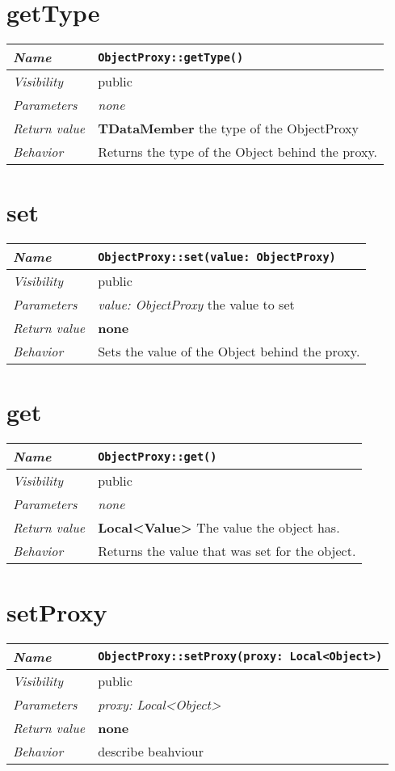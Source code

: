  \section{getType}
\begin{longtable}{p{3cm} @{\hskip 1cm} p{12cm}}
 \hline
\textit{Name} & \texttt{ObjectProxy::getType()}\\
\hline
 \textit{Visibility} & public\\
\hline
\textit{Parameters} & \textit{none}\\
\hline
\textit{Return value} & \textbf{TDataMember} the type of the ObjectProxy\\
  \hline
 \textit{Behavior} & Returns the type of the Object behind the proxy.\\
\hline
\end{longtable} \pagebreak
 \section{set}
\begin{longtable}{p{3cm} @{\hskip 1cm} p{12cm}}
 \hline
\textit{Name} & \texttt{ObjectProxy::set(value: ObjectProxy)}\\
\hline
 \textit{Visibility} & public\\
\hline
\textit{Parameters} & \textit{value: ObjectProxy} the value to set\\
\hline
\textit{Return value} & \textbf{none}\\
  \hline
 \textit{Behavior} & Sets the value of the Object behind the proxy.\\
\hline
\end{longtable} \pagebreak
 \section{get}
\begin{longtable}{p{3cm} @{\hskip 1cm} p{12cm}}
 \hline
\textit{Name} & \texttt{ObjectProxy::get()}\\
\hline
 \textit{Visibility} & public\\
\hline
\textit{Parameters} & \textit{none}\\
\hline
\textit{Return value} & \textbf{Local<Value>} The value the object has.\\
  \hline
 \textit{Behavior} & Returns the value that was set for the object.\\
\hline
\end{longtable} \pagebreak
 \section{setProxy}
\begin{longtable}{p{3cm} @{\hskip 1cm} p{12cm}}
 \hline
\textit{Name} & \texttt{ObjectProxy::setProxy(proxy: Local<Object>)}\\
\hline
 \textit{Visibility} & public\\
\hline
\textit{Parameters} & \textit{proxy: Local<Object>}\\
\hline
\textit{Return value} & \textbf{none}\\
  \hline
 \textit{Behavior} & describe beahviour \\
\hline
\end{longtable} \pagebreak
